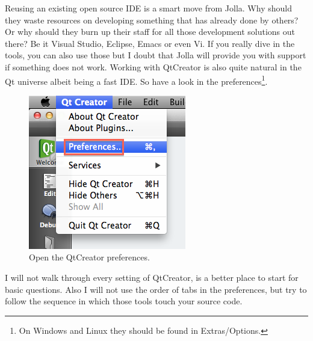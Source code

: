 Reusing an existing open source IDE is a smart move from Jolla. Why should they waste resources on developing something that has already done by others? Or why should they burn up their staff for all those development solutions out there? Be it Visual Studio, Eclipse, Emacs or even Vi. If you really dive in the tools, you can also use those but I doubt that Jolla will provide you with support if something does not work. Working with QtCreator is also quite natural in the Qt universe albeit being a fast IDE. So have a look in the preferences\footnote{On Windows and Linux they should be found in Extras/Options.}.
\begin{figure}[H]
  \centering
  \includegraphics[scale=0.7]{../media/gfx/QtCreator/QtCreatorPreferences.png} 
  \caption{Open the QtCreator preferences.}
  \label{fig:creatorpref}
\end{figure}
%
I will not walk through every setting of QtCreator, \cite{qt02} is a better place to start for basic questions.
Also I will not use the order of tabs in the preferences, but try to follow the sequence in which those tools touch your source code.
%
%
